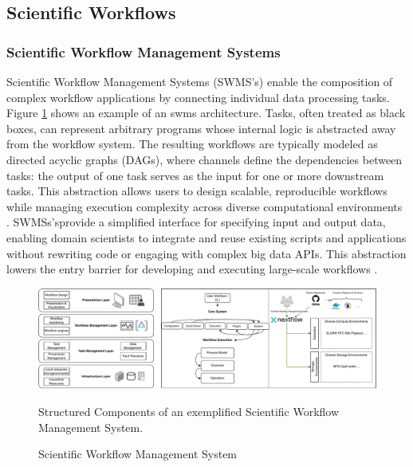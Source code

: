 \subsection{Scientific Workflows}
\label{sec:background_workflows}
\subsubsection{Scientific Workflow Management Systems}
\label{sec:background_workflows_swms}
Scientific Workflow Management Systems (SWMS's) enable the composition of complex workflow applications by connecting individual data processing tasks. Figure \ref{fig:02-swms} shows an example of an swms architecture. Tasks, often treated as black boxes, can represent arbitrary programs whose internal logic is abstracted away from the workflow system. The resulting workflows are typically modeled as directed acyclic graphs (DAGs), where channels define the dependencies between tasks: the output of one task serves as the input for one or more downstream tasks. This abstraction allows users to design scalable, reproducible workflows while managing execution complexity across diverse computational environments \cite{thamsen2025energyawareworkflowexecutionoverview}.
SWMSs'sprovide a simplified interface for specifying input and output data, enabling domain scientists to integrate and reuse existing scripts and applications without rewriting code or engaging with complex big data APIs. This abstraction lowers the entry barrier for developing and executing large-scale workflows \cite{Bader_2022}.

\begin{figure}[H]
    \centering
    \includegraphics[scale=0.45]{fig/02/02-swms.pdf}
    \small
    \caption{Scientific Workflow Management System}
    \label{fig:02-swms}
    \tiny
    Structured Components of an exemplified Scientific Workflow Management System.
\end{figure}

